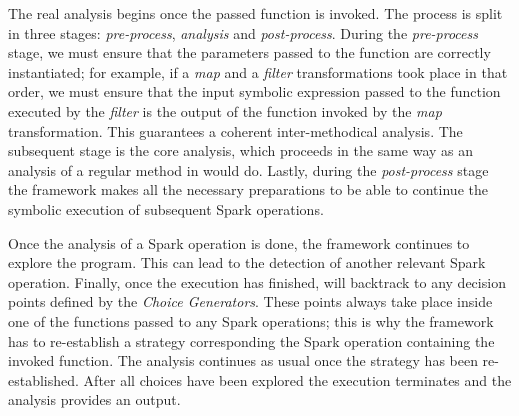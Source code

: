 The real analysis begins once the passed function is invoked. The process is split in three stages: \textit{pre-process}, \textit{analysis} and \textit{post-process}. During the \textit{pre-process} stage, we must ensure that the parameters passed to the function are correctly instantiated; for example, if a \textit{map} and a \textit{filter} transformations took place in that order, we must ensure that the input symbolic expression passed to the function executed by the \textit{filter} is the output of the function invoked by the \textit{map} transformation. This guarantees a coherent inter-methodical analysis. The subsequent stage is the core analysis, which proceeds in the same way as an analysis of a regular method in \spf would do. Lastly, during the \textit{post-process} stage the framework makes all the necessary preparations to be able to continue the symbolic execution of subsequent Spark operations.

Once the analysis of a Spark operation is done, the framework continues to explore the program. This can lead to the detection of another relevant Spark operation. Finally, once the execution has finished, \jpf will backtrack to any decision points defined by the \textit{Choice Generators}. These points always take place inside one of the functions passed to any Spark operations; this is why the framework has to re-establish a strategy corresponding the Spark operation containing the invoked function. The analysis continues as usual once the strategy has been re-established. After all choices have been explored the execution terminates and the analysis provides an output.

